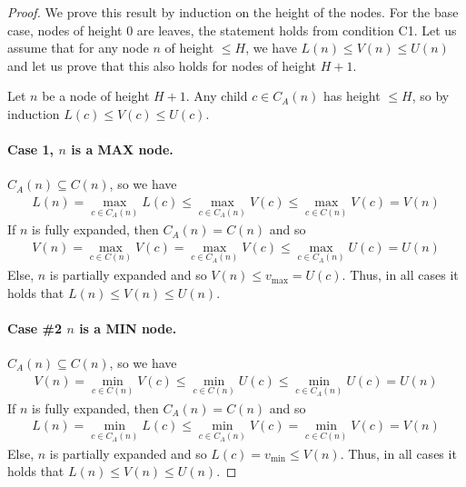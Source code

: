 \documentclass[runningheads]{llncs}
\newcommand{\MM}{\mathit{V}}
\newcommand{\pess}{\mathit{L}}
\newcommand{\opti}{\mathit{U}}
\newcommand{\vmax}{v_{\text{max}}}
\newcommand{\vmin}{v_{\text{min}}}
\begin{document}
\begin{proof}
We prove this result by induction on the height of the nodes.
For the base case, nodes of height 0 are leaves, the statement holds from condition C1.
Let us assume that for any node $n$ of height $\leq H$, we have $\pess(n)\leq \MM(n)\leq \opti(n)$ and let us prove that this also holds for nodes of height $H+1$.

Let $n$ be a node of height $H+1$.
Any child $c \in C_A(n)$ has height $\leq H$, so by induction $\pess(c)\leq \MM(c)\leq \opti(c)$.

\paragraph{Case 1, $n$ is a MAX node.}
$C_A(n) \subseteq C(n)$, so we have
\begin{align}
\!\! \pess(n) = \!\!\!\!\max_{c\in C_A(n)} \!\!\!\!\pess(c) \leq \!\!\!\!\max_{c\in C_A(n)} \!\!\!\!\MM(c) \leq \!\!\!\!\max_{c\in C(n)} \!\!\!\! \MM(c) \! = \!\!\MM(n)
\end{align}
If $n$ is fully expanded, then $C_A(n)=C(n)$ and so
\begin{align}
 \!\!\MM(n) \!= \!\!\!\!\max_{c \in C(n)} \!\!\!\!\MM(c) \!= \!\!\!\!\max_{c \in C_A(n)} \!\!\!\!\MM(c) \leq \!\!\!\!\max_{c \in C_A(n)} \!\!\!\!\opti(c) \!= \!\!\opti(n)
\end{align}
Else, $n$ is partially expanded and so $\MM(n) \leq \vmax = \opti(c)$.
Thus, in all cases it holds that $\pess(n) \leq \MM(n) \leq \opti(n)$.


\paragraph{Case \#2 $n$ is a MIN node.}
$C_A(n) \subseteq C(n)$, so we have
\begin{align}
  \!\!\!\!\MM(n) \!= \!\!\!\!\min_{c\in C(n)} \!\!\!\!\MM(c) \leq \!\!\!\!\min_{c\in C(n)} \!\!\!\!\opti(c) \leq \!\!\!\!\min_{c \in C_A(n)} \!\!\!\! \opti(c) \! = \! \opti(n)
\end{align}
If $n$ is fully expanded, then $C_A(n)=C(n)$ and so
\begin{align}
 \!\!\pess(n) \!\! = \!\!\!\!\min_{c \in C_A(n)} \!\!\!\!\pess(c) \leq \!\!\!\!\min_{c \in C_A(n)} \!\!\!\!\MM(c) = \!\!\!\!\min_{c \in C(n)} \!\!\!\!\MM(c) \!=\! \MM(n)
\end{align}
Else, $n$ is partially expanded and so $\pess(c) = \vmin\leq \MM(n)$. 
Thus, in all cases it holds that $\pess(n) \leq \MM(n) \leq \opti(n)$.


\end{proof}
\end{document}
